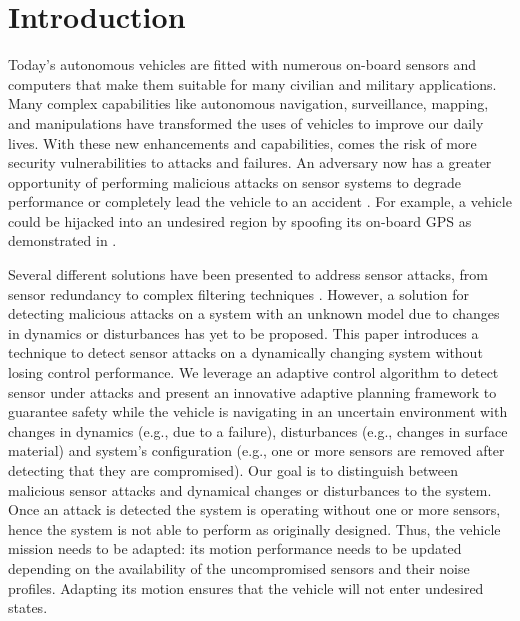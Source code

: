 
\section{Introduction} \label{sec:introduction}

Today's autonomous vehicles are fitted with numerous on-board sensors and computers that make them suitable for many civilian and military applications. Many complex capabilities like autonomous navigation, surveillance, mapping, and manipulations have transformed the uses of vehicles to improve our daily lives. 
With these new enhancements and capabilities, comes the risk of more security vulnerabilities to attacks and failures. An adversary now has a greater opportunity of performing malicious attacks on sensor systems to degrade performance or completely lead the vehicle to an accident . For example, a vehicle could be hijacked into an undesired region by spoofing its on-board GPS as demonstrated in \cite{lee}.

Several different solutions have been presented to address sensor attacks, from sensor redundancy to complex filtering techniques \cite{fawzi2014secure,pasqualetti2013attack,6120187,6943080,7330811}. However, a solution for detecting malicious attacks on a system with an unknown model due to changes in dynamics or disturbances has yet to be proposed. This paper introduces a technique to detect sensor attacks on a dynamically changing system without losing control performance. We leverage an adaptive control algorithm to detect sensor under attacks and present an innovative adaptive planning framework to guarantee safety while the vehicle is navigating in an uncertain environment with changes in dynamics (e.g., due to a failure), disturbances (e.g., changes in surface material) and system's configuration (e.g., one or more sensors are removed after detecting that they are compromised). 
Our goal is to distinguish between malicious sensor attacks and dynamical changes or disturbances to the system. Once an attack is detected the system is operating without one or more sensors, hence the system is not able to perform as originally designed. Thus, the vehicle mission needs to be adapted: its motion performance needs  to be updated depending on the availability of the uncompromised sensors and their noise profiles. Adapting its motion ensures that the vehicle will not enter undesired states. 

